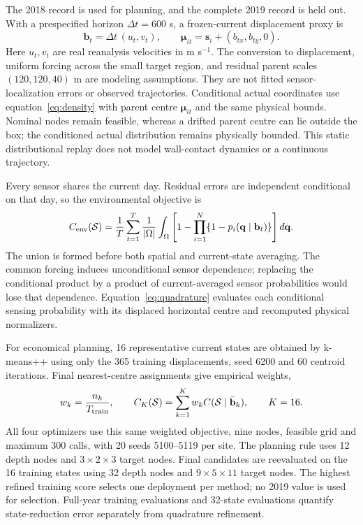 \documentclass[fleqn,10pt]{wlscirep}
\begin{document}
The 2018 record is used for planning, and the complete 2019 record is held out. With a prespecified horizon $\Delta t=600$ s, a frozen-current displacement proxy is
\begin{equation}\label{eq:current_drift}
\mathbf b_t=\Delta t\,(u_t,v_t),\qquad
\boldsymbol\mu_{it}=\mathbf s_i+(b_{tx},b_{ty},0).
\end{equation}
Here $u_t,v_t$ are real reanalysis velocities in m s$^{-1}$. The conversion to displacement, uniform forcing across the small target region, and residual parent scales $(120,120,40)$ m are modeling assumptions. They are not fitted sensor-localization errors or observed trajectories. Conditional actual coordinates use equation~\eqref{eq:density} with parent centre $\boldsymbol\mu_{it}$ and the same physical bounds. Nominal nodes remain feasible, whereas a drifted parent centre can lie outside the box; the conditioned actual distribution remains physically bounded. This static distributional replay does not model wall-contact dynamics or a continuous trajectory.

Every sensor shares the current day. Residual errors are independent conditional on that day, so the environmental objective is
\begin{equation}\label{eq:current_objective}
C_{\rm env}(\mathcal S)=\frac1T\sum_{t=1}^{T}\frac1{|\Omega|}
\int_\Omega\left[1-\prod_{i=1}^{N}\{1-p_i(\mathbf q\mid\mathbf b_t)\}\right]d\mathbf q.
\end{equation}
The union is formed before both spatial and current-state averaging. The common forcing induces unconditional sensor dependence; replacing the conditional product by a product of current-averaged sensor probabilities would lose that dependence. Equation~\eqref{eq:quadrature} evaluates each conditional sensing probability with its displaced horizontal centre and recomputed physical normalizers.

For economical planning, 16 representative current states are obtained by k-means++ using only the 365 training displacements, seed 6200 and 60 centroid iterations. Final nearest-centre assignments give empirical weights,
\begin{equation}\label{eq:current_reduction}
w_k=\frac{n_k}{T_{\rm train}},\qquad
C_K(\mathcal S)=\sum_{k=1}^{K}w_k C(\mathcal S\mid\bar{\mathbf b}_k),\qquad K=16.
\end{equation}
All four optimizers use this same weighted objective, nine nodes, feasible grid and maximum 300 calls, with 20 seeds 5100--5119 per site. The planning rule uses 12 depth nodes and $3\times2\times3$ target nodes. Final candidates are reevaluated on the 16 training states using 32 depth nodes and $9\times5\times11$ target nodes. The highest refined training score selects one deployment per method; no 2019 value is used for selection. Full-year training evaluations and 32-state evaluations quantify state-reduction error separately from quadrature refinement.
\end{document}
